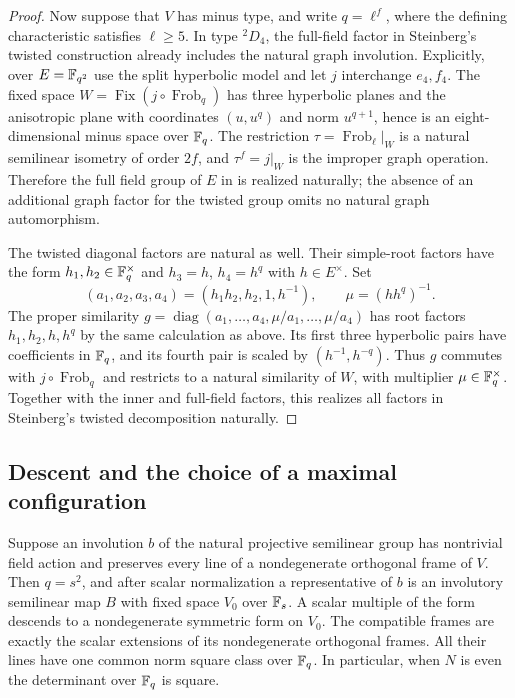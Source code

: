 \begin{proof}
Now suppose that $V$ has minus type, and write $q=\ell^f$, where the
defining characteristic satisfies $\ell\ge5$.
In type ${}^2D_4$, the full-field factor in Steinberg's twisted construction
already includes the natural graph involution.  Explicitly, over
$E=\mathbb F_{q^2}$ use the split hyperbolic model and let $j$ interchange
$e_4,f_4$.  The fixed space
$W=\operatorname{Fix}(j\circ\operatorname{Frob}_q)$ has three hyperbolic
planes and the anisotropic plane with coordinates $(u,u^q)$ and norm
$u^{q+1}$, hence is an eight-dimensional minus space over $\mathbb F_q$.
The restriction $\tau=\operatorname{Frob}_{\ell}|_W$ is a natural semilinear
isometry of order $2f$, and $\tau^f=j|_W$ is the improper graph operation.
Therefore the full field group of $E$ in
\cite[\S2 and statement~3.5]{Steinberg1960} is realized naturally; the
absence of an additional graph factor for the twisted group omits no
natural graph automorphism.

The twisted diagonal factors are natural as well.  Their simple-root
factors have the form $h_1,h_2\in\mathbb F_q^\times$ and
$h_3=h$, $h_4=h^q$ with $h\in E^\times$.  Set
\[
 (a_1,a_2,a_3,a_4)=(h_1h_2,h_2,1,h^{-1}),\qquad
 \mu=(hh^q)^{-1}.
\]
The proper similarity
$g=\operatorname{diag}(a_1,\ldots,a_4,\mu/a_1,\ldots,\mu/a_4)$
has root factors $h_1,h_2,h,h^q$ by the same calculation as above.
Its first three hyperbolic pairs have coefficients in $\mathbb F_q$,
and its fourth pair is scaled by $(h^{-1},h^{-q})$.
Thus $g$ commutes with $j\circ\operatorname{Frob}_q$ and restricts to
a natural similarity of $W$, with multiplier $\mu\in\mathbb F_q^\times$.
Together with the inner and full-field factors, this realizes all
factors in Steinberg's twisted decomposition naturally.
\end{proof}

\subsection{Descent and the choice of a maximal configuration}

\begin{lemma}\label{lem:orthogonal-descent}
Suppose an involution $b$ of the natural projective semilinear group
has nontrivial field action and preserves every line of a nondegenerate
orthogonal frame of $V$.  Then $q=s^2$, and after scalar normalization
a representative of $b$ is an involutory semilinear map $B$ with fixed
space $V_0$ over $\mathbb F_s$.  A scalar multiple of the form descends to a
nondegenerate symmetric form on $V_0$.  The compatible frames are
exactly the scalar extensions of its nondegenerate orthogonal frames.
All their lines have one common norm square class over $\mathbb F_q$.
In particular, when $N$ is even the determinant over $\mathbb F_q$ is square.
\end{lemma}

